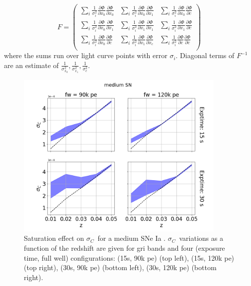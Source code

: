 \documentclass[\docopts]{\docclass}
\newcommand{\sne}{{SNe Ia }}
\newcommand{\pe}{{pe}}
\newcommand{\colorerr}{{$\sigma_C$}}
\begin{document}
$$
F = 
\begin{pmatrix}
\displaystyle \sum_{i}  \frac{1}{\sigma_i^2}\frac{\partial\Phi}{\partial x_0} \frac{\partial\Phi}{\partial x_0} & \displaystyle \sum_i  \frac{1}{\sigma_i^2}\frac{\partial\Phi}{\partial x_0} \frac{\partial\Phi}{\partial x_1}& \displaystyle  \sum_i \frac{1}{\sigma_i^2}\frac{\partial\Phi}{\partial x_0} \frac{\partial\Phi}{\partial c}\\
\displaystyle  \sum_i  \frac{1}{\sigma_i^2}\frac{\partial\Phi}{\partial x_0} \frac{\partial\Phi}{\partial x_1} & \displaystyle  \sum_i  \frac{1}{\sigma_i^2}\frac{\partial\Phi}{\partial x_1} \frac{\partial\Phi}{\partial x_1}& \displaystyle  \sum_i \frac{1}{\sigma_i^2}\frac{\partial\Phi}{\partial x_1} \frac{\partial\Phi}{\partial c}\\
\displaystyle  \sum_i  \frac{1}{\sigma_i^2}\frac{\partial\Phi}{\partial x_0} \frac{\partial\Phi}{\partial c} & \displaystyle  \sum_i  \frac{1}{\sigma_i^2}\frac{\partial\Phi}{\partial x_1} \frac{\partial\Phi}{\partial x_c}& \displaystyle  \sum_i \frac{1}{\sigma_i^2}\frac{\partial\Phi}{\partial c} \frac{\partial\Phi}{\partial c}\\
\end{pmatrix}
$$
where the sums run over light curve points with error $\sigma_i$. Diagonal terms of $F^{-1}$ are an estimate of $\frac{1}{\sigma_{x_0}^2}, \frac{1}{\sigma_{x_1}^2}, \frac{1}{\sigma_{c}^2}$. 

\begin{figure}[htbp]
\begin{center}
  \includegraphics[width=0.9\textwidth]{sigmac_medium.png}
 \caption{Saturation effect on \colorerr~for a medium \sne. \colorerr~variations as a function of the redshift are given for gri bands and four (exposure time, full well) configurations: (15s, 90k \pe) (top left),  (15s, 120k \pe) (top right), (30s, 90k \pe) (bottom left),  (30s, 120k \pe) (bottom right).}\label{fig:sigmamedium}
\end{center}
\end{figure}
\end{document}
